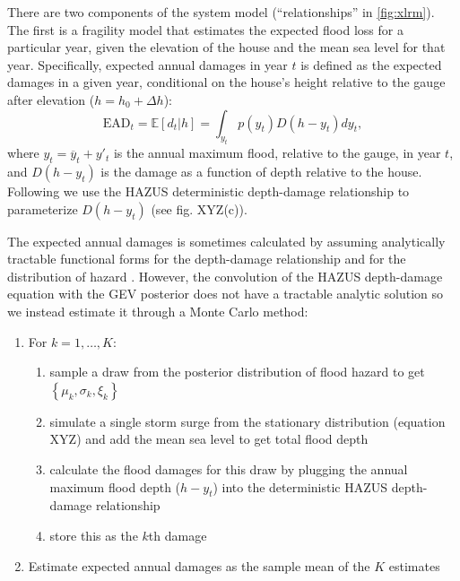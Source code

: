 \documentclass[12pt]{article}
\makeatletter
\newcommand{\james}[1]{\todo[color=giallo, textcolor=nero]{\textbf{ATTN James:~}#1}} %
\DeclareRobustCommand\onedot{\futurelet\@let@token\@onedot}
\def\@onedot{\ifx\@let@token.\else.\null\fi\xspace}
\def\eg{\emph{e.g}\onedot} \def\Eg{\emph{E.g}\onedot}
\DeclareRobustCommand\onedot{\futurelet\@let@token\@onedot}
\def\@onedot{\ifx\@let@token.\else.\null\fi\xspace}
\def\eg{\emph{e.g}\onedot} \def\Eg{\emph{E.g}\onedot}
\makeatother
\begin{document}
There are two components of the system model (``relationships'' in \cref{fig:xlrm}).
The first is a fragility model that estimates the expected flood loss for a particular year, given the elevation of the house and the mean sea level for that year.
Specifically, expected annual damages in year $t$ is defined as the expected damages in a given year, conditional on the house's height relative to the gauge after elevation ($h = h_0 + \Delta h$):
\begin{equation}
    \textrm{EAD}_t = \mathbb{E}[d_t | h] = \int_{y_t} p(y_t) D(h - y_t) dy_t,
\end{equation}
where $y_t = \overline{y}_t + y'_t$ is the annual maximum flood, relative to the gauge, in year $t$, and $D(h - y_t)$ is the damage as a function of depth relative to the house.
Following \citet{zarekarizi_suboptimal:2020} we use the HAZUS deterministic depth-damage relationship to parameterize $D(h-y_t)$ (see fig. XYZ(c)).\james{Cite HAZUS}

The expected annual damages is sometimes calculated by assuming analytically tractable functional forms for the depth-damage relationship and for the  distribution of hazard \citep[\eg][]{vandantzig_dike:1956}.
However, the convolution of the HAZUS depth-damage equation with the GEV posterior does not have a tractable analytic solution so we instead estimate it through a Monte Carlo method:
\begin{enumerate}
    \item For $k=1, \ldots, K$:
          \begin{enumerate}
              \item sample a draw from the posterior distribution of flood hazard to get $\left\{ \mu_k, \sigma_k, \xi_k \right\}$
              \item simulate a single storm surge from the stationary distribution (equation XYZ) and add the mean sea level to get total flood depth
              \item calculate the flood damages for this draw by plugging the annual maximum flood depth ($h - y_t$) into  the deterministic HAZUS depth-damage relationship
              \item store this as the $k$th damage
          \end{enumerate}
    \item Estimate expected annual damages as the sample mean of the $K$ estimates
\end{enumerate}
\end{document}
